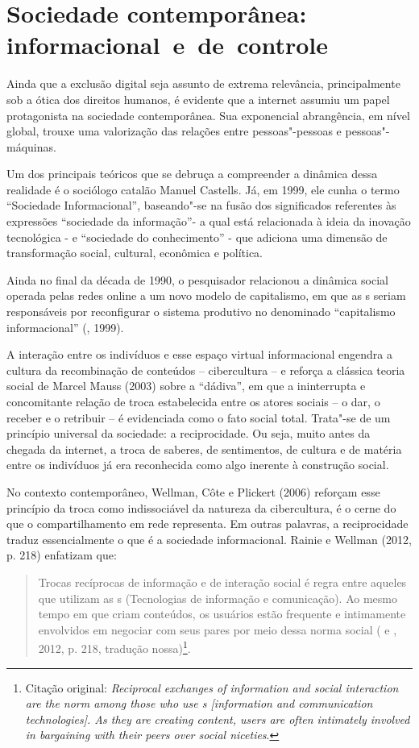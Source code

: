 \section{Sociedade contemporânea: informacional~e~de~controle}

Ainda que a exclusão digital seja assunto de extrema relevância,
principalmente sob a ótica dos direitos humanos, é evidente que a
internet assumiu um papel protagonista na sociedade contemporânea. Sua
exponencial abrangência, em nível global, trouxe uma valorização das
relações entre pessoas"-pessoas e pessoas"-máquinas.

Um dos principais teóricos que se debruça a compreender a dinâmica dessa
realidade é o sociólogo catalão Manuel Castells. Já, em 1999, ele cunha
o termo ``Sociedade Informacional'', baseando"-se na fusão dos
significados referentes às expressões ``sociedade da informação''- a
qual está relacionada à ideia da inovação tecnológica - e ``sociedade do
conhecimento'' - que adiciona uma dimensão de transformação social,
cultural, econômica e política.

Ainda no final da década de 1990, o pesquisador relacionou a dinâmica
social operada pelas redes online a um novo modelo de capitalismo, em
que as s seriam responsáveis por reconfigurar o sistema produtivo no
denominado ``capitalismo informacional'' (, 1999).

A interação entre os indivíduos e esse espaço virtual informacional
engendra a cultura da recombinação de conteúdos -- cibercultura -- e
reforça a clássica teoria social de Marcel Mauss (2003) sobre a
``dádiva'', em que a ininterrupta e concomitante relação de troca
estabelecida entre os atores sociais -- o dar, o receber e o retribuir
-- é evidenciada como o fato social total. Trata"-se de um princípio
universal da sociedade: a reciprocidade. Ou seja, muito antes da chegada
da internet, a troca de saberes, de sentimentos, de cultura e de matéria
entre os indivíduos já era reconhecida como algo inerente à construção
social.

No contexto contemporâneo, Wellman, Côte e Plickert (2006) reforçam esse
princípio da troca como indissociável da natureza da cibercultura, é o
cerne do que o compartilhamento em rede representa. Em outras palavras,
a reciprocidade traduz essencialmente o que é a sociedade informacional.
Rainie e Wellman (2012, p. 218) enfatizam que:

\begin{quote}
Trocas recíprocas de informação e de interação social é regra entre
aqueles que utilizam as s (Tecnologias de informação e comunicação).
Ao mesmo tempo em que criam conteúdos, os usuários estão frequente e
intimamente envolvidos em negociar com seus pares por meio dessa norma
social ( e , 2012, p. 218, tradução nossa)\footnote{Citação
  original: \emph{Reciprocal exchanges of information and social interaction
    are the norm among those who use s {[}information and communication
    technologies{]}. As they are creating content, users are often
    intimately involved in bargaining with their peers over social
    niceties}.}.
\end{quote}

